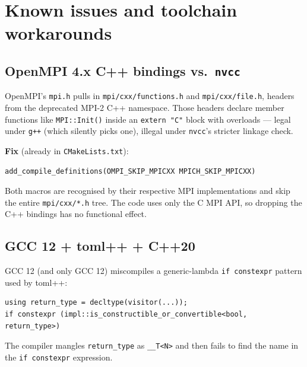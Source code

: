 \documentclass[11pt]{article}
\begin{document}
\section{Known issues and toolchain workarounds}
\label{sec:known}

\subsection{OpenMPI 4.x C++ bindings vs.\ \texttt{nvcc}}

OpenMPI's \texttt{mpi.h} pulls in \texttt{mpi/cxx/functions.h} and
\texttt{mpi/cxx/file.h}, headers from the deprecated MPI-2 C++
namespace.  Those headers declare member functions like
\texttt{MPI::Init()} inside an \texttt{extern "C"} block with
overloads --- legal under \texttt{g++} (which silently picks one),
illegal under \texttt{nvcc}'s stricter linkage check.

\textbf{Fix} (already in \texttt{CMakeLists.txt}):
\begin{lstlisting}[style=cpp]
add_compile_definitions(OMPI_SKIP_MPICXX MPICH_SKIP_MPICXX)
\end{lstlisting}
Both macros are recognised by their respective MPI implementations
and skip the entire \texttt{mpi/cxx/*.h} tree.  The code uses only
the C MPI API, so dropping the C++ bindings has no functional
effect.

\subsection{GCC 12 + toml++ + C++20}

GCC 12 (and only GCC 12) miscompiles a generic-lambda
\texttt{if constexpr} pattern used by toml++:
\begin{lstlisting}[style=cpp]
using return_type = decltype(visitor(...));
if constexpr (impl::is_constructible_or_convertible<bool, return_type>)
\end{lstlisting}
The compiler mangles \texttt{return\_type} as \texttt{\_\_T<N>} and
then fails to find the name in the \texttt{if constexpr}
expression.
\end{document}
